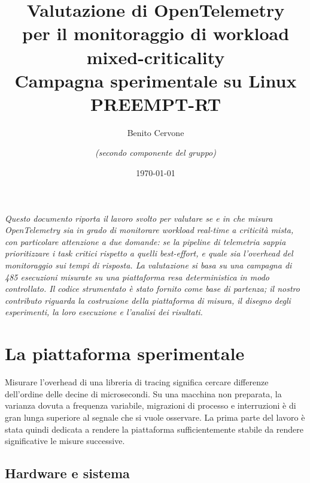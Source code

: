 \title{\vspace{-1.4cm}\textbf{Valutazione di OpenTelemetry\\per il monitoraggio di workload mixed-criticality}\\[.3em]
\large Campagna sperimentale su Linux PREEMPT-RT}
\author{Benito Cervone \and \textit{(secondo componente del gruppo)}}
\date{\today}


\maketitle
\thispagestyle{empty}

\begin{center}
\begin{minipage}{0.9\textwidth}
\small\itshape
Questo documento riporta il lavoro svolto per valutare se e in che misura OpenTelemetry sia in
grado di monitorare workload real-time a criticit\`a mista, con particolare attenzione a due
domande: se la pipeline di telemetria sappia \emph{prioritizzare} i task critici rispetto a quelli
best-effort, e quale sia l'\emph{overhead} del monitoraggio sui tempi di risposta. La valutazione
si basa su una campagna di 485 esecuzioni misurate su una piattaforma resa deterministica in modo
controllato. Il codice strumentato \`e stato fornito come base di partenza; il nostro contributo
riguarda la costruzione della piattaforma di misura, il disegno degli esperimenti, la loro
esecuzione e l'analisi dei risultati.
\end{minipage}
\end{center}

\vspace{1em}
{\small\tableofcontents}
\newpage

\section{La piattaforma sperimentale}

Misurare l'overhead di una libreria di tracing significa cercare differenze dell'ordine delle
decine di microsecondi. Su una macchina non preparata, la varianza dovuta a frequenza variabile,
migrazioni di processo e interruzioni \`e di gran lunga superiore al segnale che si vuole
osservare. La prima parte del lavoro \`e stata quindi dedicata a rendere la piattaforma
sufficientemente stabile da rendere significative le misure successive.

\subsection{Hardware e sistema}

